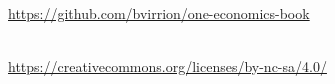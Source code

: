 \thispagestyle{empty}
\vspace*{\fill}
\begin{center}
\omcolophonsource\\[2pt]
\url{https://github.com/bvirrion/one-economics-book}

\bigskip
\omcolophonlicense\\[2pt]
\url{https://creativecommons.org/licenses/by-nc-sa/4.0/}\\[6pt]
\omcolophoncredit
\end{center}
\vspace*{\fill}
\clearpage
